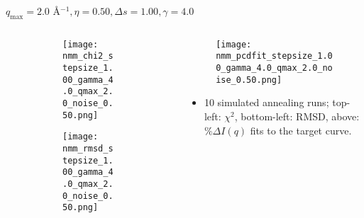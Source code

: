 \documentclass{beamer}
\begin{document}
\begin{frame}{$ q_{\textrm{max}}=2.0 $ \AA $^{-1}, \eta=0.50, \Delta s=1.00, \gamma=4.0$}
	\begin{columns}
		\begin{column}{.5\textwidth}
			\begin{figure}[H]
			\centering
			\begin{subfigure}[b]{\textwidth}
				\centering
				\texttt{[image: nmm\_chi2\_stepsize\_1.00\_gamma\_4.0\_qmax\_2.0\_noise\_0.50.png]}
				\label{fig:}
			\end{subfigure}
			\begin{subfigure}[b]{\textwidth}
				\centering
				\texttt{[image: nmm\_rmsd\_stepsize\_1.00\_gamma\_4.0\_qmax\_2.0\_noise\_0.50.png]}
				\label{fig:}
			\end{subfigure}
			\end{figure}
		\end{column}
		\begin{column}{.5\textwidth}
			\begin{figure}[H]
				\centering
				\texttt{[image: nmm\_pcdfit\_stepsize\_1.00\_gamma\_4.0\_qmax\_2.0\_noise\_0.50.png]}
				\label{fig:}
			\end{figure}
			\begin{itemize}
				\item 10 simulated annealing runs; top-left: $\chi^2$, bottom-left: RMSD, above: $\%\Delta I(q)$ fits to the target curve.
			\end{itemize}
		\end{column}
	\end{columns}
\end{frame}
 
\end{document}
